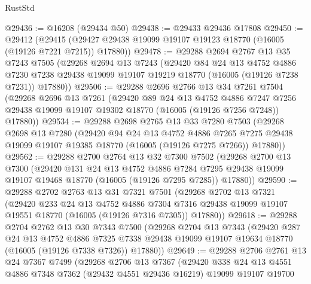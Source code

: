 \begin{lexlean}{RustStd}
\begin{coremodule}
@29436 := @16208 (@29434 @50)
@29438 := @29433 @29436 @17808
@29450 := @29412
    (@29415 (@29427 @29438 @19099 @19107 @19123 @18770 (@16005 (@19126 @7221 @7215)) @17880))
@29478 := @29288
    @2694
    @2767
    @13
    @35
    @7243
    @7505
    (@29268
      @2694
      @13
      @7243
      (@29420
        @84
        @24
        @13
        @4752
        @4886
        @7230
        @7238
        @29438
        @19099
        @19107
        @19219
        @18770
        (@16005 (@19126 @7238 @7231))
        @17880))
@29506 := @29288
    @2696
    @2766
    @13
    @34
    @7261
    @7504
    (@29268
      @2696
      @13
      @7261
      (@29420
        @89
        @24
        @13
        @4752
        @4886
        @7247
        @7256
        @29438
        @19099
        @19107
        @19302
        @18770
        (@16005 (@19126 @7256 @7248))
        @17880))
@29534 := @29288
    @2698
    @2765
    @13
    @33
    @7280
    @7503
    (@29268
      @2698
      @13
      @7280
      (@29420
        @94
        @24
        @13
        @4752
        @4886
        @7265
        @7275
        @29438
        @19099
        @19107
        @19385
        @18770
        (@16005 (@19126 @7275 @7266))
        @17880))
@29562 := @29288
    @2700
    @2764
    @13
    @32
    @7300
    @7502
    (@29268
      @2700
      @13
      @7300
      (@29420
        @131
        @24
        @13
        @4752
        @4886
        @7284
        @7295
        @29438
        @19099
        @19107
        @19468
        @18770
        (@16005 (@19126 @7295 @7285))
        @17880))
@29590 := @29288
    @2702
    @2763
    @13
    @31
    @7321
    @7501
    (@29268
      @2702
      @13
      @7321
      (@29420
        @233
        @24
        @13
        @4752
        @4886
        @7304
        @7316
        @29438
        @19099
        @19107
        @19551
        @18770
        (@16005 (@19126 @7316 @7305))
        @17880))
@29618 := @29288
    @2704
    @2762
    @13
    @30
    @7343
    @7500
    (@29268
      @2704
      @13
      @7343
      (@29420
        @287
        @24
        @13
        @4752
        @4886
        @7325
        @7338
        @29438
        @19099
        @19107
        @19634
        @18770
        (@16005 (@19126 @7338 @7326))
        @17880))
@29649 := @29288
    @2706
    @2761
    @13
    @24
    @7367
    @7499
    (@29268
      @2706
      @13
      @7367
      (@29420
        @338
        @24
        @13
        @4551
        @4886
        @7348
        @7362
        (@29432 @4551 @29436 @16219)
        @19099
        @19107
        @19700

\end{coremodule}
\end{lexlean}
